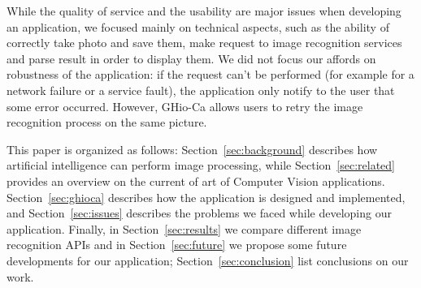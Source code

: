 While the quality of service and the usability are major issues when developing an application, we focused mainly on technical aspects, such as the ability of correctly take photo and save them, make request to image recognition services and parse result in order to display them. We did not focus our affords on robustness of the application: if the request can't be performed (for example for a network failure or a service fault), the application only notify to the user that some error occurred. However, GHio-Ca allows users to retry the image recognition process on the same picture.

This paper is organized as follows: Section~\ref{sec:background} describes how artificial intelligence can perform image processing, while Section~\ref{sec:related} provides an overview on the current of art of Computer Vision applications. Section~\ref{sec:ghioca} describes how the application is designed and implemented, and Section~\ref{sec:issues} describes the problems we faced while developing our application. Finally, in Section~\ref{sec:results} we compare different image recognition APIs and in Section~\ref{sec:future} we propose some future developments for our application; Section~\ref{sec:conclusion} list conclusions on our work.





